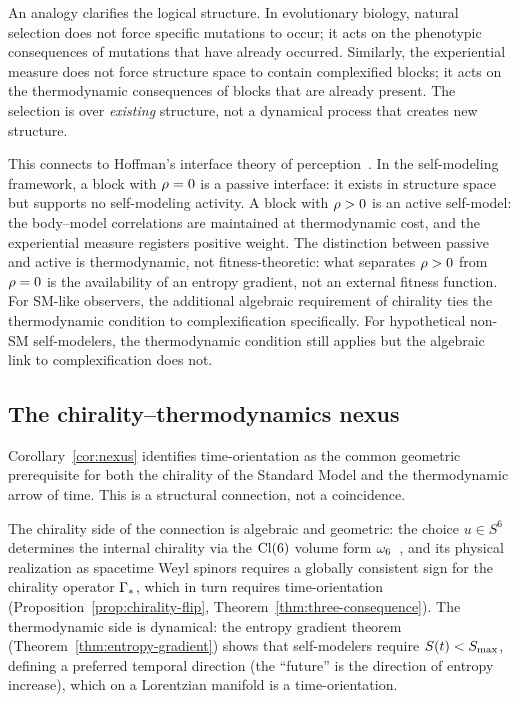 An analogy clarifies the logical structure.  In evolutionary biology,
natural selection does not force specific mutations to occur; it acts
on the phenotypic consequences of mutations that have already occurred.
Similarly, the experiential measure does not force structure space to
contain complexified blocks; it acts on the thermodynamic consequences
of blocks that are already present.  The selection is over
\emph{existing} structure, not a dynamical process that creates new
structure.

This connects to Hoffman's interface theory of
perception~\cite{Hoffman2015}.  In the self-modeling framework, a
block with $\rho = 0$ is a passive interface: it exists in
structure space but supports no self-modeling activity.  A block with
$\rho > 0$ is an active self-model: the body--model correlations
are maintained at thermodynamic cost, and the experiential measure
registers positive weight.  The distinction between passive and active
is thermodynamic, not fitness-theoretic: what separates $\rho > 0$
from $\rho = 0$ is the availability of an entropy gradient, not
an external fitness function.  For SM-like observers, the additional
algebraic requirement of chirality ties the thermodynamic condition
to complexification specifically.  For hypothetical non-SM
self-modelers, the thermodynamic condition still applies but the
algebraic link to complexification does not.

\subsection{The chirality--thermodynamics nexus}
\label{sec:nexus-discussion}

Corollary~\ref{cor:nexus} identifies time-orientation as the common
geometric prerequisite for both the chirality of the Standard Model
and the thermodynamic arrow of time.  This is a structural connection,
not a coincidence.

The chirality side of the connection is algebraic and geometric:
the choice $u\in S^6$ determines the internal chirality via the
$\mathrm{Cl}(6)$ volume form $\omega_6$~\cite{Paper7}, and its physical
realization as spacetime Weyl spinors requires a globally consistent
sign for the chirality operator $\Gamma_*$, which in turn requires
time-orientation
(Proposition~\ref{prop:chirality-flip},
Theorem~\ref{thm:three-consequence}).
The thermodynamic side is dynamical: the entropy gradient theorem
(Theorem~\ref{thm:entropy-gradient}) shows that self-modelers require
$S(t) < S_{\max}$, defining a preferred temporal direction (the
``future'' is the direction of entropy increase), which on a
Lorentzian manifold is a time-orientation.

